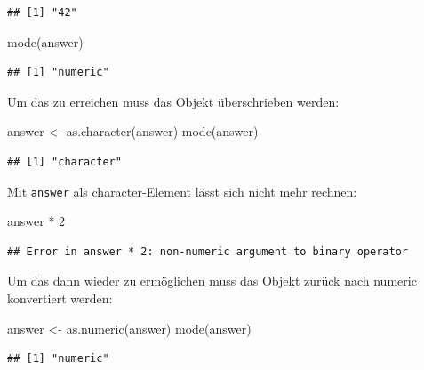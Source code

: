 \documentclass[
]{book}
\newenvironment{Shaded}{\begin{snugshade}}{\end{snugshade}}
\newcommand{\DecValTok}[1]{\textcolor[rgb]{0.00,0.00,0.81}{#1}}
\newcommand{\FunctionTok}[1]{\textcolor[rgb]{0.00,0.00,0.00}{#1}}
\newcommand{\NormalTok}[1]{#1}
\newcommand{\OtherTok}[1]{\textcolor[rgb]{0.56,0.35,0.01}{#1}}
\newcommand{\SpecialCharTok}[1]{\textcolor[rgb]{0.00,0.00,0.00}{#1}}
\begin{document}
\begin{verbatim}
## [1] "42"
\end{verbatim}

\begin{Shaded}
\begin{Highlighting}[]
\FunctionTok{mode}\NormalTok{(answer)}
\end{Highlighting}
\end{Shaded}

\begin{verbatim}
## [1] "numeric"
\end{verbatim}

Um das zu erreichen muss das Objekt überschrieben werden:

\begin{Shaded}
\begin{Highlighting}[]
\NormalTok{answer }\OtherTok{\textless{}{-}} \FunctionTok{as.character}\NormalTok{(answer)}
\FunctionTok{mode}\NormalTok{(answer)}
\end{Highlighting}
\end{Shaded}

\begin{verbatim}
## [1] "character"
\end{verbatim}

Mit \texttt{answer} als character-Element lässt sich nicht mehr rechnen:

\begin{Shaded}
\begin{Highlighting}[]
\NormalTok{answer }\SpecialCharTok{*} \DecValTok{2}
\end{Highlighting}
\end{Shaded}

\begin{verbatim}
## Error in answer * 2: non-numeric argument to binary operator
\end{verbatim}

Um das dann wieder zu ermöglichen muss das Objekt zurück nach numeric konvertiert werden:

\begin{Shaded}
\begin{Highlighting}[]
\NormalTok{answer }\OtherTok{\textless{}{-}} \FunctionTok{as.numeric}\NormalTok{(answer)}
\FunctionTok{mode}\NormalTok{(answer)}
\end{Highlighting}
\end{Shaded}

\begin{verbatim}
## [1] "numeric"
\end{verbatim}
\end{document}
